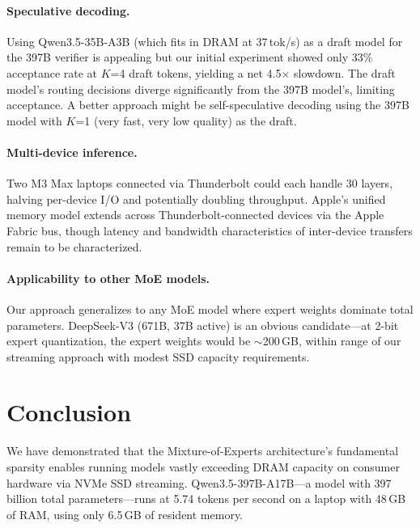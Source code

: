 \documentclass[11pt,twocolumn]{article}
\begin{document}
\paragraph{Speculative decoding.}
Using Qwen3.5-35B-A3B (which fits in DRAM at 37\,tok/s) as a draft model for the 397B verifier is appealing but our initial experiment showed only 33\% acceptance rate at $K$=4 draft tokens, yielding a net 4.5$\times$ slowdown.
The draft model's routing decisions diverge significantly from the 397B model's, limiting acceptance.
A better approach might be self-speculative decoding using the 397B model with $K$=1 (very fast, very low quality) as the draft.

\paragraph{Multi-device inference.}
Two M3 Max laptops connected via Thunderbolt could each handle 30 layers, halving per-device I/O and potentially doubling throughput.
Apple's unified memory model extends across Thunderbolt-connected devices via the Apple Fabric bus, though latency and bandwidth characteristics of inter-device transfers remain to be characterized.

\paragraph{Applicability to other MoE models.}
Our approach generalizes to any MoE model where expert weights dominate total parameters.
DeepSeek-V3 (671B, 37B active) is an obvious candidate---at 2-bit expert quantization, the expert weights would be $\sim$200\,GB, within range of our streaming approach with modest SSD capacity requirements.

\section{Conclusion}

We have demonstrated that the Mixture-of-Experts architecture's fundamental sparsity enables running models vastly exceeding DRAM capacity on consumer hardware via NVMe SSD streaming.
Qwen3.5-397B-A17B---a model with 397 billion total parameters---runs at 5.74 tokens per second on a laptop with 48\,GB of RAM, using only 6.5\,GB of resident memory.
\end{document}
